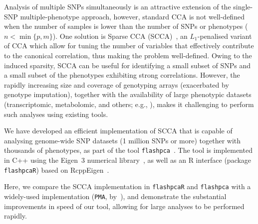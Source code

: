 \documentclass{bioinfo}
\begin{document}
Analysis of multiple SNPs simultaneously is an attractive extension
of the single-SNP multiple-phenotype approach, however, standard
CCA is not well-defined when the number of samples is lower than the
number of SNPs or phenotypes ($n{<}\min\{p, m\}$).  One solution is
Sparse CCA (SCCA)~\citep{Witten2009c,Witten2009b,Parkhomenko2009},
an $L_1$-penalised variant of CCA which allow for tuning the number of
variables that effectively contribute to the canonical correlation, thus
making the problem well-defined. Owing to the induced sparsity, SCCA can
be useful for identifying a small subset of SNPs and a small subset of the
phenotypes exhibiting strong correlations.  However, the rapidly increasing
size and coverage of genotyping arrays (exacerbated by genotype imputation),
together with the availability of large phenotypic datasets (transcriptomic,
metabolomic, and others; e.g., \citet{Bartel2015,TheGTExConsortium2015}),
makes it challenging to perform such analyses using existing tools.

We have developed an efficient implementation of SCCA that is
capable of analysing genome-wide SNP datasets (1 million SNPs
or more) together with thousands of phenotypes, as part of the tool
\texttt{flashpca}~\citep{Abraham2014}. The tool is implemented in \textsf{C++}
using the Eigen~3 numerical library~\citep{eigenweb}, as well as an \textsf{R}
interface (package \texttt{flashpcaR}) based on RcppEigen~\citep{Bates2013}.

Here, we compare the SCCA implementation in \texttt{flashpcaR} and
\texttt{flashpca} with a widely-used implementation (\texttt{PMA},
by~\citet{Witten2013}), and demonstrate the substantial improvements in
speed of our tool, allowing for large analyses to be performed rapidly.
\end{document}
